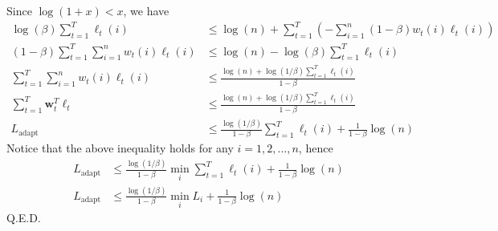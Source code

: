 \documentclass[12pt,oneside,a4paper]{article}
\begin{document}
Since $\log(1 + x) < x$, we have
\begin{equation*}
\begin{aligned}
\log(\beta)\sum_{t = 1}^{T}\ell_{t}(i) &\leq \log(n) + \sum_{t = 1}^{T}\left(-\sum_{i = 1}^{n}(1 - \beta)w_{t}(i)\ell_{t}(i)\right)\\
(1 - \beta)\sum_{t = 1}^{T}\sum_{i = 1}^{n}w_{t}(i)\ell_{t}(i) &\leq \log(n) - \log(\beta)\sum_{t = 1}^{T}\ell_{t}(i)\\
\sum_{t = 1}^{T}\sum_{i = 1}^{n}w_{t}(i)\ell_{t}(i) &\leq \frac{\log(n) + \log(1/\beta)\sum_{t = 1}^{T}\ell_{t}(i)}{1 - \beta}\\
\sum_{t = 1}^{T}\bm{w}_{t}^{T}\ell_{t} &\leq \frac{\log(n) + \log(1/\beta)\sum_{t = 1}^{T}\ell_{t}(i)}{1 - \beta}\\
L_{\mathrm{adapt}} &\leq \frac{\log(1 / \beta)}{1 - \beta}\sum_{t = 1}^{T}\ell_{t}(i) + \frac{1}{1 - \beta}\log(n)
\end{aligned}
\end{equation*}
Notice that the above inequality holds for any $i = 1, 2, ..., n$, hence
\begin{equation*}
\begin{aligned}
L_{\mathrm{adapt}} &\leq \frac{\log(1 / \beta)}{1 - \beta} \min_{i}\sum_{t = 1}^{T}\ell_{t}(i) + \frac{1}{1 - \beta}\log(n)\\
L_{\mathrm{adapt}} &\leq \frac{\log(1 / \beta)}{1 - \beta} \min_{i}L_{i} + \frac{1}{1 - \beta}\log(n)
\end{aligned}
\end{equation*}
Q.E.D.\newline
\end{document}
